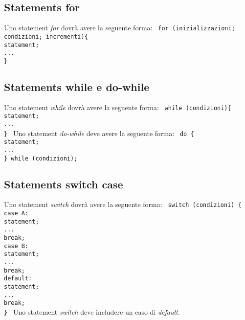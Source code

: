 \subsection{Statements for}
Uno statement \textit{for} dovr\`a avere la seguente forma: \newline
\texttt{
	 \newline
	for (inizializzazioni; condizioni; incrementi)\{ \\
	\phantom{....}statement;\\
	\phantom{....}... \\
	\}
}
\subsection{Statements while e do-while}
Uno statement \textit{while} dovr\`a avere la seguente forma:\newline
\texttt{
	 \newline
	while (condizioni)\{ \\
	\phantom{....}statement;\\
	\phantom{....}... \\
	\}
}\newline
 \newline
Uno statement \textit{do-while} deve avere la seguente forma: \newline
\texttt{
	 \newline
	do \{ \\
	\phantom{....}statement;\\
	\phantom{....}... \\
	\} while (condizioni);
}
\subsection{Statements switch case}
Uno statement \textit{switch} dovr\`a avere la seguente forma:\newline
\texttt{
	 \newline
	switch (condizioni) \{ \\
	case A:\\
	\phantom{....}statement;\\
	\phantom{....}...\\
	\phantom{....}break;\\
	case B:\\
	\phantom{....}statement;\\
	\phantom{....}...\\
	\phantom{....}break;\\
	default:\\
	\phantom{....}statement;\\
	\phantom{....}...\\
	\phantom{....}break;\\
	\}
}\newline
 \newline
Uno statement \textit{switch} deve includere un caso di \textit{default}.
